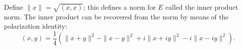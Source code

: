 Define $\|x\| = \sqrt{(x,x)}$; this defines a norm for $E$ called the inner product norm. The inner product can be recovered from the norm by means of the polarization identity:
$$
(x,y) = \frac{1}{4}\left( \|x + y\|^2 - \|x - y\|^2 + i \|x + iy\|^2 - i \|x - iy\|^2 \right).
$$
